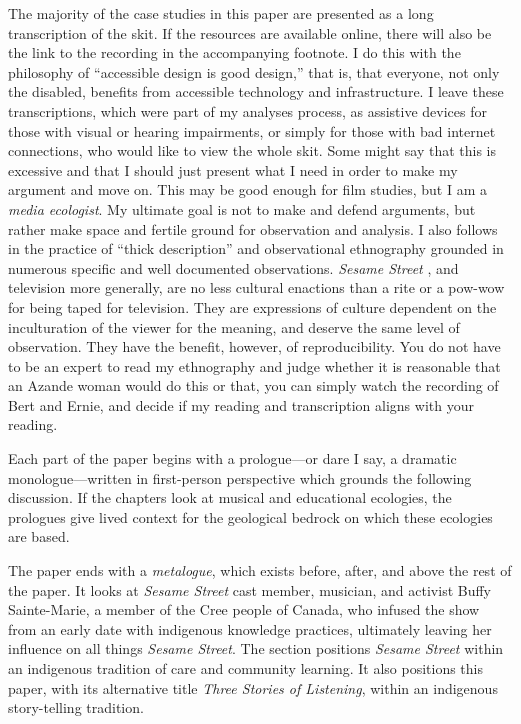 \documentclass[12pt,letterpaper]{article}
\newcommand{\ses}{\textit{Sesame Street }}
\begin{document}
	The majority of the case studies in this paper are presented as a long
	transcription of the skit. If the resources are available online, 
	there will also be the link to the recording in the accompanying 
	footnote. I do this with the philosophy of ``accessible design is good 
	design,'' that is, that everyone, not only the disabled, benefits from
	accessible technology and infrastructure. I leave these transcriptions,
	which were part of my analyses process, as assistive devices for those
	with visual or hearing impairments, or simply for those with bad
	internet connections, who would like to view the whole skit. Some might
	say that this is excessive and that I should just present what I need 
	in order to make my argument and move on. This may be good enough for 
	film studies, but I am a \textit{media ecologist}. My ultimate goal is 
	not to make and defend arguments, but rather make space and fertile 
	ground for observation and analysis. I also follows in the 
	practice of ``thick description'' and observational ethnography 
	grounded in numerous specific and well documented observations.
	\ses, and television more generally, are no less cultural enactions
	than a rite or a pow-wow for being taped for television. They are
	expressions of culture dependent on the inculturation of the viewer 
	for the meaning, and deserve the same level of observation. They have 
	the benefit, however, of reproducibility. You do not have to be an 
	expert to read my ethnography and judge whether it is reasonable that
	an Azande woman would do this or that, you can simply watch the
	recording of Bert and Ernie, and decide if my reading and transcription
	aligns with your reading. 

	Each part of the paper begins with a prologue---or dare I say, a 
	dramatic monologue---written in first-person perspective
	which grounds the following discussion. If the chapters look at
	musical and educational ecologies, the prologues give lived context for
	the geological bedrock on which these ecologies are based.  

	The paper ends with a \textit{metalogue}, which exists before, after, 
	and above the rest of the paper. It looks at \ses cast member, 
	musician, and activist Buffy Sainte-Marie, a member of the Cree people
	of Canada, who infused the show from an early date with indigenous 
	knowledge practices, ultimately leaving her influence on all things 
	\textit{Sesame Street}. The section positions \ses within an indigenous
	tradition of care and community learning.
	It also positions this paper, with its alternative title 
	\textit{Three Stories of Listening}, within an indigenous story-telling
	tradition. 
\end{document}
